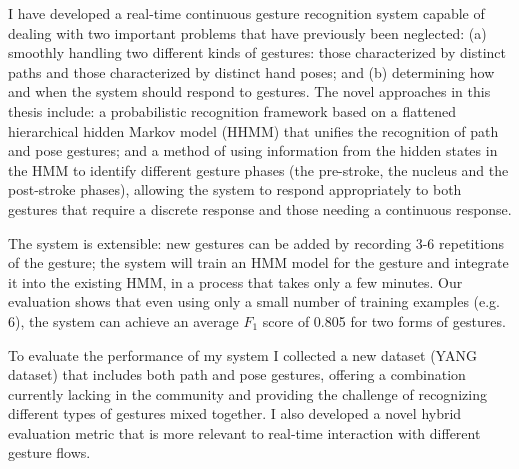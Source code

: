 I have developed a real-time continuous gesture recognition system capable of
dealing with two important problems that have previously been neglected:
(a) smoothly handling two different kinds of gestures: those
characterized by distinct paths and those characterized by distinct hand
poses; and (b) determining how and when the system should respond to gestures.
The novel approaches in this thesis include: a probabilistic recognition
framework based on a flattened hierarchical hidden Markov model (HHMM) that
unifies the recognition of path and pose gestures;
and a method of using information from the
hidden states in the HMM to identify different
gesture phases (the pre-stroke, the nucleus and the post-stroke
phases), allowing the system to respond appropriately to both gestures that
require a discrete response and those needing a continuous response.

The system is extensible: new gestures can be added by recording 3-6 repetitions
of the gesture; the system will train an HMM model for the gesture
and integrate it into the existing HMM, in a process that takes only a few minutes.
Our evaluation shows that even using only a small number of
training examples (e.g. 6), the system can achieve an average $F_1$ score of
0.805 for
two forms of gestures.

To evaluate the performance of my system I collected a new dataset
(YANG dataset) that includes both path and pose gestures, offering a
combination currently lacking in the community and providing
the challenge of recognizing different types of gestures mixed
together. I also developed a novel hybrid evaluation metric that is
more relevant to real-time interaction with different gesture flows.